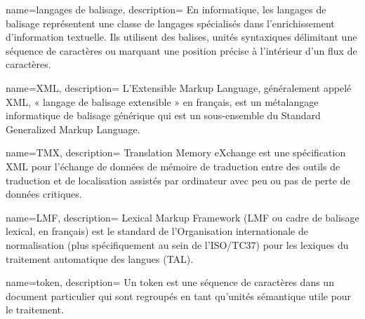 {
    name=langages de balisage,
    description={
    En informatique, les langages de balisage représentent une classe de langages spécialisés dans l'enrichissement d'information textuelle. Ils utilisent des balises, unités syntaxiques délimitant une séquence de caractères ou marquant une position précise à l'intérieur d'un flux de caractères.
    }
}

{
    name=XML,
    description={
    L'Extensible Markup Language, généralement appelé XML, « langage de balisage extensible » en français, est un métalangage informatique de balisage générique qui est un sous-ensemble du Standard Generalized Markup Language. 
    }
}


{
    name=TMX,
    description={
    Translation Memory eXchange est une spécification XML pour l'échange de données de mémoire de traduction entre des outils de traduction et de localisation assistés par ordinateur avec peu ou pas de perte de données critiques.
    }
}

{
    name=LMF,
    description={
    Lexical Markup Framework (LMF ou cadre de balisage lexical, en français) est le standard de l'Organisation internationale de normalisation (plus spécifiquement au sein de l'ISO/TC37) pour les lexiques du traitement automatique des langues (TAL).
    }
}

{
    name=token,
    description={
    Un token est une séquence de caractères dans un document particulier qui sont regroupés en tant qu'unités sémantique utile pour le traitement.
    }
}